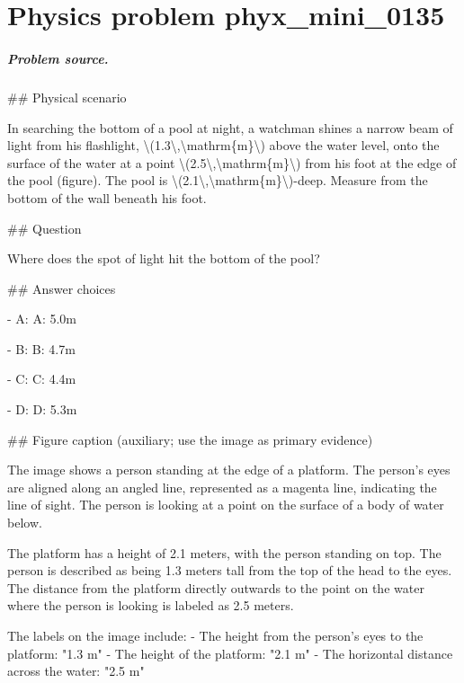 
\chapter{Physics problem phyx\_mini\_0135}
\label{ch:PhyXMiniProblems_problem_phyx_mini_0135}

\paragraph{Problem source.}
\#\# Physical scenario

In searching the bottom of a pool at night, a watchman shines a narrow beam of light from his flashlight, \textbackslash{}(1.3\textbackslash{},\textbackslash{}mathrm\{m\}\textbackslash{}) above the water level, onto the surface of the water at a point \textbackslash{}(2.5\textbackslash{},\textbackslash{}mathrm\{m\}\textbackslash{}) from his foot at the edge of the pool (figure). The pool is \textbackslash{}(2.1\textbackslash{},\textbackslash{}mathrm\{m\}\textbackslash{})-deep. Measure from the bottom of the wall beneath his foot.

\#\# Question

Where does the spot of light hit the bottom of the pool?

\#\# Answer choices

- A: A: 5.0m

- B: B: 4.7m

- C: C: 4.4m

- D: D: 5.3m

\#\# Figure caption (auxiliary; use the image as primary evidence)

The image shows a person standing at the edge of a platform. The person's eyes are aligned along an angled line, represented as a magenta line, indicating the line of sight. The person is looking at a point on the surface of a body of water below.

The platform has a height of 2.1 meters, with the person standing on top. The person is described as being 1.3 meters tall from the top of the head to the eyes. The distance from the platform directly outwards to the point on the water where the person is looking is labeled as 2.5 meters.

The labels on the image include:
- The height from the person's eyes to the platform: "1.3 m"
- The height of the platform: "2.1 m"
- The horizontal distance across the water: "2.5 m"

